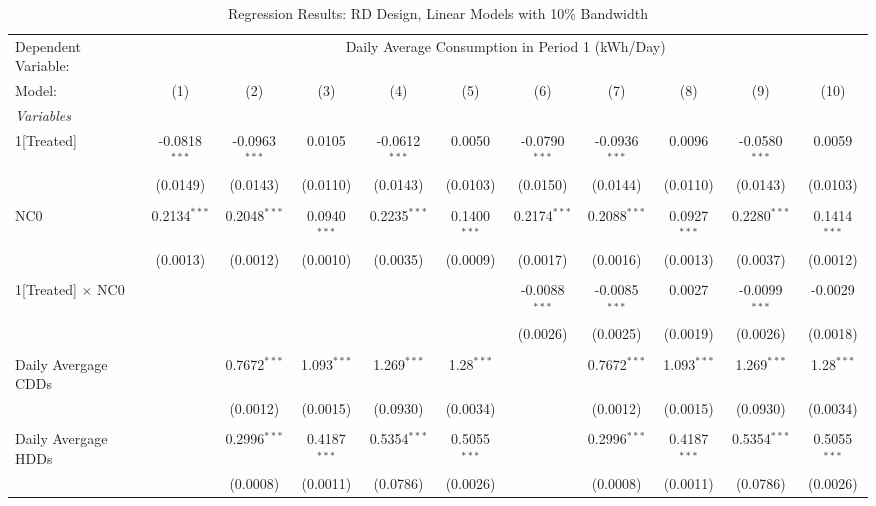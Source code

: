 \begin{table}[htbp]
\centering
\caption{\label{Table:Regression-Results_RD_Linear_BW-10} Regression Results: RD Design, Linear Models with 10\% Bandwidth}
\begin{adjustbox}{scale = 0.75}
\begin{tabular}{lcccccccccc}
\tabularnewline\toprule\toprule
Dependent Variable:&\multicolumn{10}{c}{Daily Average Consumption in Period 1 (kWh/Day)}\\
Model:&(1) & (2) & (3) & (4) & (5) & (6) & (7) & (8) & (9) & (10)\\
\midrule
\emph{Variables}&   &   &   &   &   &   &   &   &   &  \\
1[Treated]&-0.0818$^{***}$ & -0.0963$^{***}$ & 0.0105 & -0.0612$^{***}$ & 0.0050 & -0.0790$^{***}$ & -0.0936$^{***}$ & 0.0096 & -0.0580$^{***}$ & 0.0059\\
  &(0.0149) & (0.0143) & (0.0110) & (0.0143) & (0.0103) & (0.0150) & (0.0144) & (0.0110) & (0.0143) & (0.0103)\\
& & & & & & & & & & \\
NC0&0.2134$^{***}$ & 0.2048$^{***}$ & 0.0940$^{***}$ & 0.2235$^{***}$ & 0.1400$^{***}$ & 0.2174$^{***}$ & 0.2088$^{***}$ & 0.0927$^{***}$ & 0.2280$^{***}$ & 0.1414$^{***}$\\
  &(0.0013) & (0.0012) & (0.0010) & (0.0035) & (0.0009) & (0.0017) & (0.0016) & (0.0013) & (0.0037) & (0.0012)\\
& & & & & & & & & & \\
1[Treated] $\times $ NC0&   &    &    &    &    & -0.0088$^{***}$ & -0.0085$^{***}$ & 0.0027 & -0.0099$^{***}$ & -0.0029\\
  &   &    &    &    &    & (0.0026) & (0.0025) & (0.0019) & (0.0026) & (0.0018)\\
& & & & & & & & & & \\
Daily Avergage CDDs&   & 0.7672$^{***}$ & 1.093$^{***}$ & 1.269$^{***}$ & 1.28$^{***}$ &    & 0.7672$^{***}$ & 1.093$^{***}$ & 1.269$^{***}$ & 1.28$^{***}$\\
  &   & (0.0012) & (0.0015) & (0.0930) & (0.0034) &    & (0.0012) & (0.0015) & (0.0930) & (0.0034)\\
& & & & & & & & & & \\
Daily Avergage HDDs&   & 0.2996$^{***}$ & 0.4187$^{***}$ & 0.5354$^{***}$ & 0.5055$^{***}$ &    & 0.2996$^{***}$ & 0.4187$^{***}$ & 0.5354$^{***}$ & 0.5055$^{***}$\\
  &   & (0.0008) & (0.0011) & (0.0786) & (0.0026) &    & (0.0008) & (0.0011) & (0.0786) & (0.0026)\\

\end{tabular}
\end{adjustbox}
\end{table}
